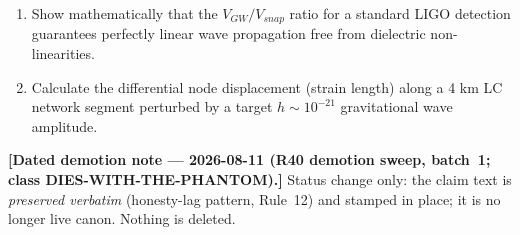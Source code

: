 \begin{exercisebox}
\begin{enumerate}
    \item Show mathematically that the $V_{GW}/V_{snap}$ ratio for a standard LIGO detection guarantees perfectly linear wave propagation free from dielectric non-linearities.
    \item Calculate the differential node displacement (strain length) along a 4 km LC network segment perturbed by a target $h \sim 10^{-21}$ gravitational wave amplitude.
\end{enumerate}
\end{exercisebox}

\medskip
\noindent\textbf{[Dated demotion note --- 2026-08-11 (R40 demotion sweep, batch~1;
class DIES-WITH-THE-PHANTOM).]} Status change only: the claim text is \emph{preserved
verbatim} (honesty-lag pattern, Rule~12) and stamped in place; it is no longer live canon.
Nothing is deleted.

